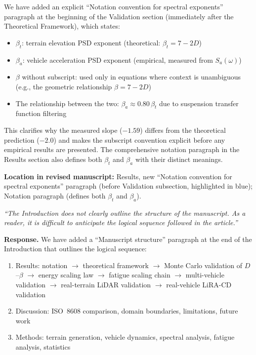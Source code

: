 \documentclass[11pt]{article}
\newcommand{\revquote}[1]{\medskip\noindent\textit{``#1''}\medskip}
\newcommand{\revloc}[1]{\noindent\textbf{Location in revised manuscript:} #1\medskip}
\begin{document}
We have added an explicit ``Notation convention for spectral exponents'' paragraph at the beginning of the Validation section (immediately after the Theoretical Framework), which states:

\begin{itemize}[leftmargin=*]
\item $\beta_t$: terrain elevation PSD exponent (theoretical: $\beta_t = 7-2D$)
\item $\beta_a$: vehicle acceleration PSD exponent (empirical, measured from $S_a(\omega)$)
\item $\beta$ without subscript: used only in equations where context is unambiguous (e.g., the geometric relationship $\beta = 7-2D$)
\item The relationship between the two: $\beta_a \approx 0.80 \, \beta_t$ due to suspension transfer function filtering
\end{itemize}

\noindent This clarifies why the measured slope ($-1.59$) differs from the theoretical prediction ($-2.0$) and makes the subscript convention explicit before any empirical results are presented. The comprehensive notation paragraph in the Results section also defines both $\beta_t$ and $\beta_a$ with their distinct meanings.

\revloc{Results, new ``Notation convention for spectral exponents'' paragraph (before Validation subsection, highlighted in blue); Notation paragraph (defines both $\beta_t$ and $\beta_a$).}

\bigskip

\revquote{The Introduction does not clearly outline the structure of the manuscript. As a reader, it is difficult to anticipate the logical sequence followed in the article.}

\noindent\textbf{Response.} We have added a ``Manuscript structure'' paragraph at the end of the Introduction that outlines the logical sequence:

\begin{enumerate}[leftmargin=*]
\item Results: notation $\rightarrow$ theoretical framework $\rightarrow$ Monte Carlo validation of $D$--$\beta$ $\rightarrow$ energy scaling law $\rightarrow$ fatigue scaling chain $\rightarrow$ multi-vehicle validation $\rightarrow$ real-terrain LiDAR validation $\rightarrow$ real-vehicle LiRA-CD validation
\item Discussion: ISO~8608 comparison, domain boundaries, limitations, future work
\item Methods: terrain generation, vehicle dynamics, spectral analysis, fatigue analysis, statistics
\end{enumerate}
\end{document}
